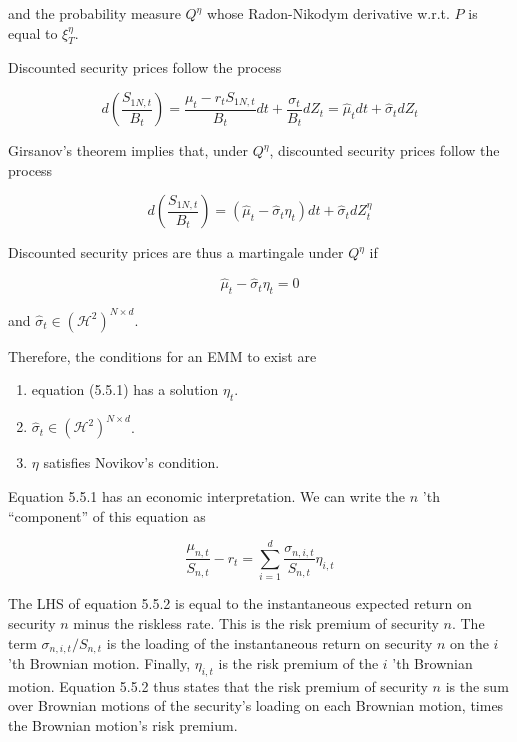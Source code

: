 \documentclass[\topdir/lecture\_notes.tex]{subfiles}
\begin{document}
and the probability measure $Q^{\eta}$ whose Radon-Nikodym derivative w.r.t. $P$ is equal to $\xi_{T}^{\eta}$.

Discounted security prices follow the process

\begin{equation*}
d\left(\frac{S_{1 N, t}}{B_{t}}\right)=\frac{\mu_{t}-r_{t} S_{1 N, t}}{B_{t}} d t+\frac{\sigma_{t}}{B_{t}} d Z_{t}=\hat{\mu}_{t} d t+\hat{\sigma}_{t} d Z_{t}
\end{equation*}

Girsanov's theorem implies that, under $Q^{\eta}$, discounted security prices follow the process

\begin{equation*}
d\left(\frac{S_{1 N, t}}{B_{t}}\right)=\left(\hat{\mu}_{t}-\hat{\sigma}_{t} \eta_{t}\right) d t+\hat{\sigma}_{t} d Z_{t}^{\eta}
\end{equation*}

Discounted security prices are thus a martingale under $Q^{\eta}$ if

\begin{equation}
\hat{\mu}_{t}-\hat{\sigma}_{t} \eta_{t}=0 \label{eq:martingale_condition}
\end{equation}

and $\hat{\sigma}_{t} \in\left(\mathcal{H}^{2}\right)^{N \times d}$.

Therefore, the conditions for an EMM to exist are

\begin{enumerate}
  \item equation (5.5.1) has a solution $\eta_{t}$.
  \item $\hat{\sigma}_{t} \in\left(\mathcal{H}^{2}\right)^{N \times d}$.
  \item $\eta$ satisfies Novikov's condition.
\end{enumerate}

Equation 5.5.1 has an economic interpretation. We can write the $n$ 'th ``component'' of this equation as

\begin{equation*}
\frac{\mu_{n, t}}{S_{n, t}}-r_{t}=\sum_{i=1}^{d} \frac{\sigma_{n, i, t}}{S_{n, t}} \eta_{i, t}
\end{equation*}

The LHS of equation 5.5.2 is equal to the instantaneous expected return on security $n$ minus the riskless rate. This is the risk premium of security $n$. The term $\sigma_{n, i, t} / S_{n, t}$ is the loading of the instantaneous return on security $n$ on the $i$ 'th Brownian motion. Finally, $\eta_{i, t}$ is the risk premium of the $i$ 'th Brownian motion. Equation 5.5.2 thus states that the risk premium of security $n$ is the sum over Brownian motions of the security's loading on each Brownian motion, times the Brownian motion's risk premium.
\end{document}
